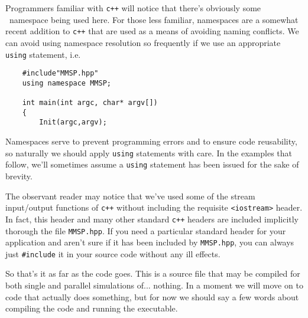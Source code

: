 Programmers familiar with {\tt c++} will notice that there's obviously some \MMSP\ namespace being used here.  For those less familiar, namespaces are a somewhat recent addition to {\tt c++} that are used as a means of avoiding naming conflicts.  We can avoid using namespace resolution so frequently if we use an appropriate {\tt using} statement, i.e. 
\begin{shadebox}
\begin{verbatim}
    #include"MMSP.hpp"
    using namespace MMSP;

    int main(int argc, char* argv[])
    {
        Init(argc,argv);
\end{verbatim}
\end{shadebox}
Namespaces serve to prevent programming errors and to ensure code reusability, so naturally we should apply {\tt using} statements with care.  In the examples that follow, we'll sometimes assume a {\tt using} statement has been issued for the sake of brevity.

The observant reader may notice that we've used some of the stream input/output functions of {\tt c++} without including the requisite {\tt <iostream>} header.  In fact, this header and many other standard {\tt c++} headers are included implicitly thorough the file {\tt MMSP.hpp}.  If you need a particular standard header for your application and aren't sure if it has been included by {\tt MMSP.hpp}, you can always just {\tt \#include} it in your source code without any ill effects.

So that's it as far as the code goes.  This is a source file that may be compiled for both single and parallel simulations of... nothing.  In a moment we will move on to code that actually does something, but for now we should say a few words about compiling the code and running the executable.

